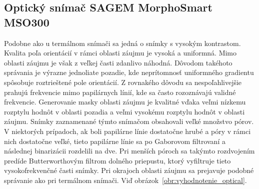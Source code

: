  \subsection{Optický snímač SAGEM MorphoSmart MSO300}
  Podobne ako u termálnom snímači sa jedná o snímky s vysokým kontrastom. Kvalita poľa orientácií v rámci oblasti záujmu je vysoká a uniformná. Mimo oblasti
  záujmu je však z veľkej časti zdanlivo náhodná. Dôvodom takéhoto správania je výrazne jednoliate pozadie, kde neprítomnosť uniformného gradientu spôsobuje
  roztrieštené pole orientácií. Z rovnakého dôvodu sa nespoľahlivejšie prahujú frekvencie mimo papilárnych línií, kde sa často rozoznávajú validné frekvencie.
  Generovanie masky oblasti záujmu je kvalitné vďaka veľmi nízkemu rozptylu hodnôt v oblasti pozadia a veľmi vysokému rozptylu hodnôt
  v oblasti záujmu.
  Snímky zaznamenané týmto snímačom obsahovali veľké množstvo pórov. V niektorých prípadoch, ak boli papilárne línie dostatočne hrubé a póry v rámci nich
  dostatočne veľké, tieto papilárne línie sa po Gaborovom filtrovaní a následnej binarizácii rozdelili na dve. Pri menších póroch sa takýmto rozdvojením
  predíde Butterworthovým filtrom dolného priepustu, ktorý vyfiltruje tieto vysokofrekvenčné časti snímky. Pri okrajoch oblasti záujmu sa prejavuje podobné
  správanie ako pri termálnom snímači.
  Viď obrázok~{\ref{obr:vyhodnotenie_optical}}.
